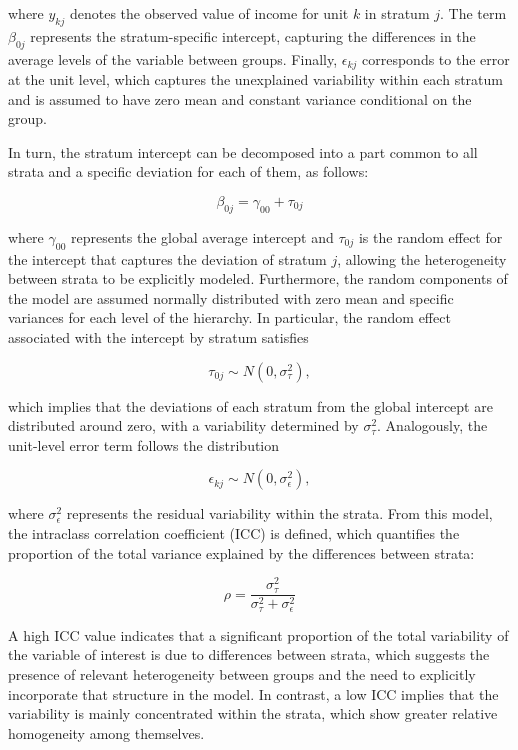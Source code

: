 \documentclass[
  english,
  12pt,
]{book}
\begin{document}
where \(y_{kj}\) denotes the observed value of income for unit \(k\) in stratum \(j\). The term \(\beta_{0j}\) represents the stratum-specific intercept, capturing the differences in the average levels of the variable between groups. Finally, \(\epsilon_{kj}\) corresponds to the error at the unit level, which captures the unexplained variability within each stratum and is assumed to have zero mean and constant variance conditional on the group.

In turn, the stratum intercept can be decomposed into a part common to all strata and a specific deviation for each of them, as follows:

\[
\beta_{0j} = \gamma_{00} + \tau_{0j}
\]

where \(\gamma_{00}\) represents the global average intercept and \(\tau_{0j}\) is the random effect for the intercept that captures the deviation of stratum \(j\), allowing the heterogeneity between strata to be explicitly modeled. Furthermore, the random components of the model are assumed normally distributed with zero mean and specific variances for each level of the hierarchy. In particular, the random effect associated with the intercept by stratum satisfies

\[
\tau_{0j} \sim N\left(0, \sigma_{\tau}^{2}\right),
\]

which implies that the deviations of each stratum from the global intercept are distributed around zero, with a variability determined by \(\sigma_{\tau}^{2}\). Analogously, the unit-level error term follows the distribution

\[
\epsilon_{kj} \sim N\left(0, \sigma_{\epsilon}^{2}\right),
\]

where \(\sigma_{\epsilon}^{2}\) represents the residual variability within the strata. From this model, the intraclass correlation coefficient (ICC) is defined, which quantifies the proportion of the total variance explained by the differences between strata:

\[
\rho = \frac{\sigma_{\tau}^{2}}{\sigma_{\tau}^{2} + \sigma_{\epsilon}^{2}}
\]

A high ICC value indicates that a significant proportion of the total variability of the variable of interest is due to differences between strata, which suggests the presence of relevant heterogeneity between groups and the need to explicitly incorporate that structure in the model. In contrast, a low ICC implies that the variability is mainly concentrated within the strata, which show greater relative homogeneity among themselves.
\end{document}
